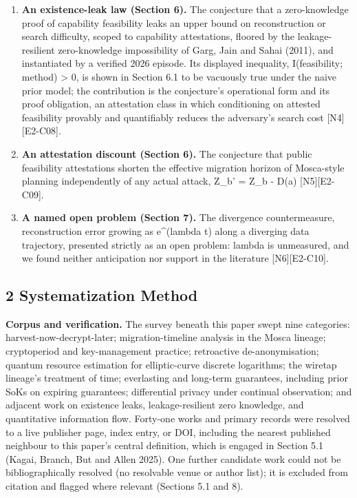 \documentclass[
  11pt,
]{article}
\begin{document}
\begin{enumerate}
  al.~2023) and the nearest survey of long-term guarantees covers
  integrity, not confidentiality (Vigil et al.~2015) {[}N7{]}.
\item
  \textbf{An existence-leak law (Section 6).} The conjecture that a
  zero-knowledge proof of capability feasibility leaks an upper bound on
  reconstruction or search difficulty, scoped to capability
  attestations, floored by the leakage-resilient zero-knowledge
  impossibility of Garg, Jain and Sahai (2011), and instantiated by a
  verified 2026 episode. Its displayed inequality, I(feasibility;
  method) \textgreater{} 0, is shown in Section 6.1 to be vacuously true
  under the naive prior model; the contribution is the conjecture's
  operational form and its proof obligation, an attestation class in
  which conditioning on attested feasibility provably and quantifiably
  reduces the adversary's search cost {[}N4{]}{[}E2-C08{]}.
\item
  \textbf{An attestation discount (Section 6).} The conjecture that
  public feasibility attestations shorten the effective migration
  horizon of Mosca-style planning independently of any actual attack,
  Z\_b' = Z\_b - D(a) {[}N5{]}{[}E2-C09{]}.
\item
  \textbf{A named open problem (Section 7).} The divergence
  countermeasure, reconstruction error growing as e\^{}(lambda t) along
  a diverging data trajectory, presented strictly as an open problem:
  lambda is unmeasured, and we found neither anticipation nor support in
  the literature {[}N6{]}{[}E2-C10{]}.
\end{enumerate}

\subsection{2 Systematization Method}\label{systematization-method}

\textbf{Corpus and verification.} The survey beneath this paper swept
nine categories: harvest-now-decrypt-later; migration-timeline analysis
in the Mosca lineage; cryptoperiod and key-management practice;
retroactive de-anonymisation; quantum resource estimation for
elliptic-curve discrete logarithms; the wiretap lineage's treatment of
time; everlasting and long-term guarantees, including prior SoKs on
expiring guarantees; differential privacy under continual observation;
and adjacent work on existence leaks, leakage-resilient zero knowledge,
and quantitative information flow. Forty-one works and primary records
were resolved to a live publisher page, index entry, or DOI, including
the nearest published neighbour to this paper's central definition,
which is engaged in Section 5.1 (Kagai, Branch, But and Allen 2025). One
further candidate work could not be bibliographically resolved (no
resolvable venue or author list); it is excluded from citation and
flagged where relevant (Sections 5.1 and 8).
\end{document}
